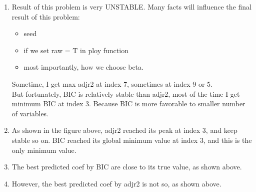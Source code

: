 \documentclass[a4paper]{article}
\begin{document}
{\color{red}
\begin{enumerate}
\item Result of this problem is very UNSTABLE. Many facts will influence the final result of this problem:
\begin{itemize}
\item seed
\item if we set raw = T in ploy function
\item most importantly, how we choose beta.
\end{itemize}
Sometime, I get max adjr2 at index 7, sometimes at index 9 or 5.\\
But fortunately, BIC is relatively stable than adjr2, most of the time I get minimum BIC at index 3. Because BIC is more favorable to smaller number of variables.\\
\item As shown in the figure above, adjr2 reached its peak at index 3, and keep stable so on.
BIC reached its global minimum value at index 3, and this is the only minimum value.
\item The best predicted coef by BIC are close to its true value, as shown above.
\item However, the best predicted coef by adjr2 is not so, as shown above.
\end{enumerate}
}
\end{document}
